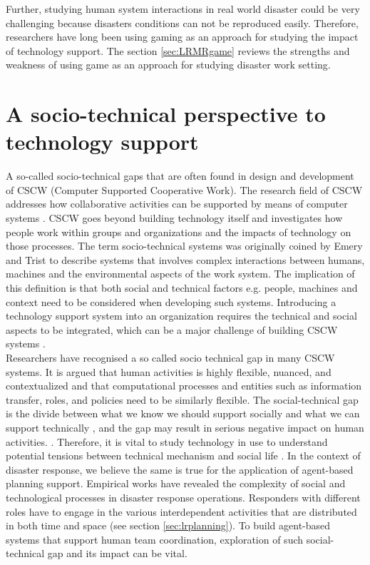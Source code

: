 Further, studying human system interactions in real world disaster could be very challenging because disasters conditions can not be reproduced easily. Therefore, researchers have long been using gaming as an approach for studying the impact of technology support.  The section \ref{sec:LRMRgame} reviews the strengths and weakness of using game as an approach for studying disaster work setting. \\


\section{A socio-technical perspective to technology support} \label{sec:LRSocialTechnical}

A so-called socio-technical gaps that are often found in design and development of CSCW (Computer Supported Cooperative Work). The research field of CSCW addresses how collaborative activities can be supported by means of computer systems \cite{Carstensen1999}.  CSCW goes beyond building technology itself and investigates how people work within groups and organizations and the impacts of technology on those processes. The term socio-technical systems was originally coined by Emery and Trist \cite{Ropohl1999} to describe systems that involves complex interactions between humans, machines and the environmental aspects of the work system. The implication of this definition is that both social and technical factors e.g. people, machines and context need to be considered when developing such systems. Introducing a technology support system into an organization requires the technical and social aspects to be integrated, which can be a major challenge of building CSCW systems \cite{Ackerman2000}. \\

Researchers have recognised a so called socio technical gap in many CSCW systems. It is argued that \cite{Ackerman2000}  human activities is highly flexible, nuanced, and contextualized and that computational processes and entities such as information transfer, roles, and policies need to be similarly flexible. The social-technical gap is the divide between what we know we should support socially and what we can support technically \cite{Ackerman2000}, and the gap may result in serious negative impact on human activities. \cite{Bowers1994,Abbott1994a}. Therefore, it is vital to study technology in use to understand potential tensions between technical mechanism and social life \cite{Bowers1994}.  In the context of disaster response, we believe the same is true for the application of agent-based planning support. Empirical works \cite{Petrescuprahova2005,Kopena2008,Fischer2015,Zerger2003} have revealed the complexity of social and technological processes in disaster response operations. Responders with different roles have to engage in the various interdependent activities that are distributed in both time and space (see section \ref{sec:lrplanning}). To build agent-based systems that support human team coordination, exploration of such social-technical gap and its impact can be vital. \\ 


